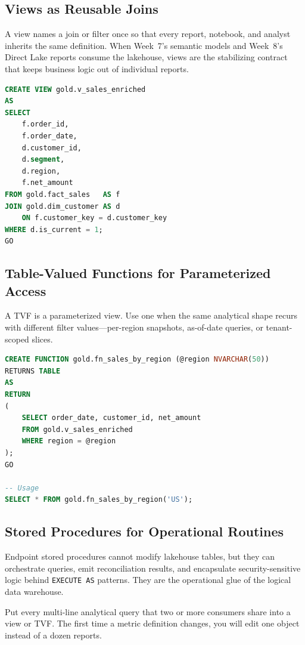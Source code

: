 \subsection{Views as Reusable Joins}
A view names a join or filter once so that every report, notebook, and analyst inherits the same definition. When Week~7's semantic models and Week~8's Direct Lake reports consume the lakehouse, views are the stabilizing contract that keeps business logic out of individual reports.

\begin{lstlisting}[language=SQL,caption={A view joining Silver detail to a Gold dimension.},label={lst:chapter6-view}]
CREATE VIEW gold.v_sales_enriched
AS
SELECT
    f.order_id,
    f.order_date,
    d.customer_id,
    d.segment,
    d.region,
    f.net_amount
FROM gold.fact_sales   AS f
JOIN gold.dim_customer AS d
    ON f.customer_key = d.customer_key
WHERE d.is_current = 1;
GO
\end{lstlisting}

\subsection{Table-Valued Functions for Parameterized Access}
A TVF is a parameterized view. Use one when the same analytical shape recurs with different filter values---per-region snapshots, as-of-date queries, or tenant-scoped slices.

\begin{lstlisting}[language=SQL,caption={An inline TVF for region-scoped sales.},label={lst:chapter6-tvf}]
CREATE FUNCTION gold.fn_sales_by_region (@region NVARCHAR(50))
RETURNS TABLE
AS
RETURN
(
    SELECT order_date, customer_id, net_amount
    FROM gold.v_sales_enriched
    WHERE region = @region
);
GO

-- Usage
SELECT * FROM gold.fn_sales_by_region('US');
\end{lstlisting}

\subsection{Stored Procedures for Operational Routines}
Endpoint stored procedures cannot modify lakehouse tables, but they can orchestrate queries, emit reconciliation results, and encapsulate security-sensitive logic behind \texttt{EXECUTE AS} patterns. They are the operational glue of the logical data warehouse.

\begin{tipbox}
Put every multi-line analytical query that two or more consumers share into a view or TVF. The first time a metric definition changes, you will edit one object instead of a dozen reports.
\end{tipbox}

